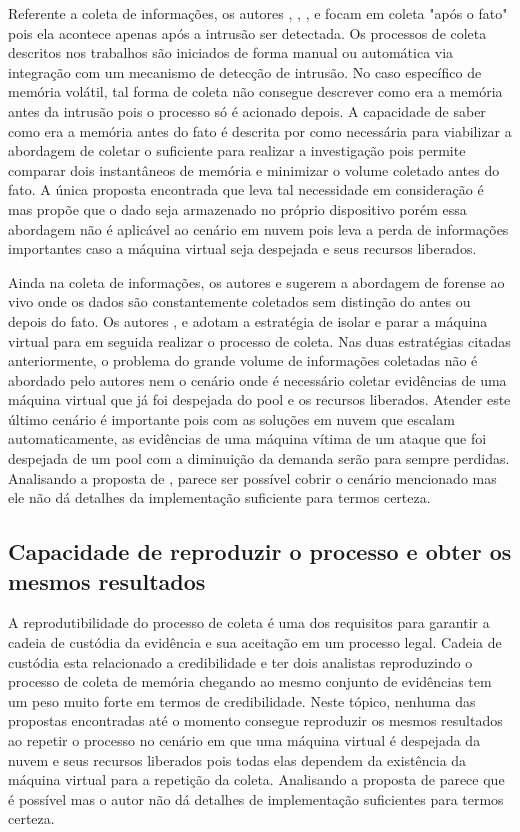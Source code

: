 \documentclass[conference]{IEEEtran}
\begin{document}
Referente a coleta de informações, os autores \cite{Reichert2015}, \cite{Poisel2013}, \cite{Dykstra2013}, \cite{George2012} e \cite{Sang2013} focam em coleta "após o fato" pois ela acontece apenas após a intrusão ser detectada. 
%
Os processos de coleta descritos nos trabalhos são iniciados de forma manual ou automática via integração com um mecanismo de detecção de intrusão. 
%
No caso específico de memória volátil, tal forma de coleta não consegue descrever como era a memória antes da intrusão pois o processo só é acionado depois. 
%
A capacidade de saber como era a memória antes do fato é descrita por \cite{Case2014} como necessária para viabilizar a abordagem de coletar o suficiente para realizar a investigação pois permite comparar dois instantâneos de memória e minimizar o volume coletado antes do fato. 
%
A única proposta encontrada que leva tal necessidade em consideração é \cite{Dezfouli2012} mas propõe que o dado seja armazenado no próprio dispositivo porém essa abordagem não é aplicável ao cenário em nuvem pois leva a perda de informações importantes caso a máquina virtual seja despejada e seus recursos liberados.

Ainda na coleta de informações, os autores \cite{Reichert2015} e \cite{George2012} sugerem a abordagem de forense ao vivo onde os dados são constantemente coletados sem distinção do antes ou depois do fato. 
%
Os autores \cite{Poisel2013}, \cite{Dykstra2013} e \cite{Sang2013} adotam a estratégia de isolar e parar a máquina virtual para em seguida realizar o processo de coleta. 
%
Nas duas estratégias citadas anteriormente, o problema do grande volume de informações coletadas não é abordado pelo autores nem o cenário onde é necessário coletar evidências de uma máquina virtual que já foi despejada do pool e os recursos liberados. 
%
Atender este último cenário é importante pois com as soluções em nuvem que escalam automaticamente, as evidências de uma máquina vítima de um ataque que foi despejada de um pool com a diminuição da demanda serão para sempre perdidas. 
%
Analisando a proposta de \cite{Poisel2013}, parece ser possível cobrir o cenário mencionado mas ele não dá detalhes da implementação suficiente para termos certeza.

\subsection{Capacidade de reproduzir o processo e obter os mesmos resultados}

A reprodutibilidade do processo de coleta é uma dos requisitos para garantir a cadeia de custódia da evidência e sua aceitação em um processo legal. Cadeia de custódia esta relacionado a credibilidade e ter dois analistas reproduzindo o processo de coleta de memória chegando ao mesmo conjunto de evidências tem um peso muito forte em termos de credibilidade. 
%
Neste tópico, nenhuma das propostas encontradas até o momento consegue reproduzir os mesmos resultados ao repetir o processo no cenário em que uma máquina virtual é despejada da nuvem e seus recursos liberados pois todas elas dependem da existência da máquina virtual para a repetição da coleta. 
%
Analisando a proposta de \cite{George2012} parece que é possível mas o autor não dá detalhes de implementação suficientes para termos certeza.
\end{document}
